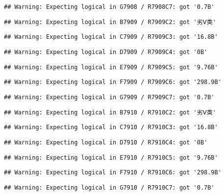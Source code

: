 \documentclass[
]{article}
\begin{document}
\begin{verbatim}
## Warning: Expecting logical in G7908 / R7908C7: got '0.7B'
\end{verbatim}

\begin{verbatim}
## Warning: Expecting logical in B7909 / R7909C2: got '劣Ⅴ类'
\end{verbatim}

\begin{verbatim}
## Warning: Expecting logical in C7909 / R7909C3: got '16.8B'
\end{verbatim}

\begin{verbatim}
## Warning: Expecting logical in D7909 / R7909C4: got '0B'
\end{verbatim}

\begin{verbatim}
## Warning: Expecting logical in E7909 / R7909C5: got '9.76B'
\end{verbatim}

\begin{verbatim}
## Warning: Expecting logical in F7909 / R7909C6: got '298.9B'
\end{verbatim}

\begin{verbatim}
## Warning: Expecting logical in G7909 / R7909C7: got '0.7B'
\end{verbatim}

\begin{verbatim}
## Warning: Expecting logical in B7910 / R7910C2: got '劣Ⅴ类'
\end{verbatim}

\begin{verbatim}
## Warning: Expecting logical in C7910 / R7910C3: got '16.8B'
\end{verbatim}

\begin{verbatim}
## Warning: Expecting logical in D7910 / R7910C4: got '0B'
\end{verbatim}

\begin{verbatim}
## Warning: Expecting logical in E7910 / R7910C5: got '9.76B'
\end{verbatim}

\begin{verbatim}
## Warning: Expecting logical in F7910 / R7910C6: got '298.9B'
\end{verbatim}

\begin{verbatim}
## Warning: Expecting logical in G7910 / R7910C7: got '0.7B'
\end{verbatim}
\end{document}
